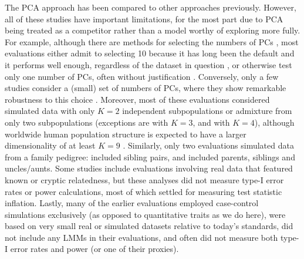 \documentclass[11pt]{article}
\begin{document}





The PCA approach has been compared to other approaches previously.
However, all of these studies have important limitations, for the most part due to PCA being treated as a competitor rather than a model worthy of exploring more fully.
For example, although there are methods for selecting the numbers of PCs \citep{patterson_population_2006}, most evaluations either admit to selecting 10 because it has long been the default and it performs well enough, regardless of the dataset in question \citep{epstein_simple_2007, li_improved_2008, astle_population_2009, li_correcting_2010, wu_comparison_2011}, or otherwise test only one number of PCs, often without justification \citep{zhang_semiparametric_2003, kimmel_randomization_2007, zhao_arabidopsis_2007, zhang_comparison_2008, price_new_2010, bouaziz_accounting_2011, hoffman_correcting_2013, wang_analytical_2013, tucker_improving_2014, yang_advantages_2014, song_testing_2015, sul_population_2018}.
Conversely, only a few studies consider a (small) set of numbers of PCs, where they show remarkable robustness to this choice \citep{price_principal_2006, kang_variance_2010, wojcik_genetic_2019}.
Moreover, most of these evaluations considered simulated data with only $K = 2$ independent subpopulations or admixture from only two subpopulations (exceptions are \citet{astle_population_2009} with $K=3$, and \citet{wu_comparison_2011, wang_analytical_2013} with $K = 4$), although worldwide human population structure is expected to have a larger dimensionality of at least $K = 9$ \citep{wojcik_genetic_2019}.
Similarly, only two evaluations simulated data from a family pedigree: \citet{price_new_2010} included sibling pairs, and \citet{thornton_roadtrips:_2010} included parents, siblings and uncles/aunts.
Some studies include evaluations involving real data that featured known or cryptic relatedness, but these analyses did not measure type-I error rates or power calculations, most of which settled for measuring test statistic inflation.
Lastly, many of the earlier evaluations employed case-control simulations exclusively (as opposed to quantitative traits as we do here), were based on very small real or simulated datasets relative to today's standards, did not include any LMMs in their evaluations, and often did not measure both type-I error rates and power (or one of their proxies).
\end{document}
